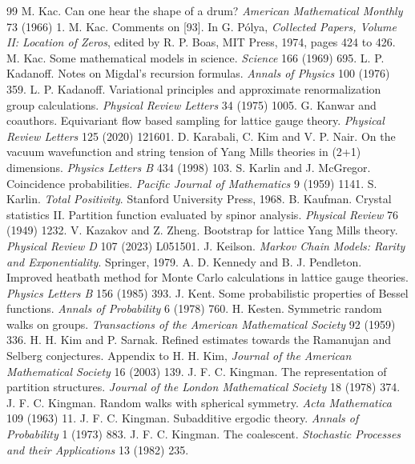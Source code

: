 \begin{thebibliography}{99}
 M. Kac. Can one hear the shape of a drum? \emph{American Mathematical Monthly} 73 (1966) 1.
 M. Kac. Comments on [93]. In G. P\'olya, \emph{Collected Papers, Volume II: Location of Zeros}, edited by R. P. Boas, MIT Press, 1974, pages 424 to 426.
 M. Kac. Some mathematical models in science. \emph{Science} 166 (1969) 695.
 L. P. Kadanoff. Notes on Migdal's recursion formulas. \emph{Annals of Physics} 100 (1976) 359.
 L. P. Kadanoff. Variational principles and approximate renormalization group calculations. \emph{Physical Review Letters} 34 (1975) 1005.
 G. Kanwar and coauthors. Equivariant flow based sampling for lattice gauge theory. \emph{Physical Review Letters} 125 (2020) 121601.
 D. Karabali, C. Kim and V. P. Nair. On the vacuum wavefunction and string tension of Yang Mills theories in (2+1) dimensions. \emph{Physics Letters B} 434 (1998) 103.
 S. Karlin and J. McGregor. Coincidence probabilities. \emph{Pacific Journal of Mathematics} 9 (1959) 1141.
 S. Karlin. \emph{Total Positivity}. Stanford University Press, 1968.
 B. Kaufman. Crystal statistics II. Partition function evaluated by spinor analysis. \emph{Physical Review} 76 (1949) 1232.
 V. Kazakov and Z. Zheng. Bootstrap for lattice Yang Mills theory. \emph{Physical Review D} 107 (2023) L051501.
 J. Keilson. \emph{Markov Chain Models: Rarity and Exponentiality}. Springer, 1979.
 A. D. Kennedy and B. J. Pendleton. Improved heatbath method for Monte Carlo calculations in lattice gauge theories. \emph{Physics Letters B} 156 (1985) 393.
 J. Kent. Some probabilistic properties of Bessel functions. \emph{Annals of Probability} 6 (1978) 760.
 H. Kesten. Symmetric random walks on groups. \emph{Transactions of the American Mathematical Society} 92 (1959) 336.
 H. H. Kim and P. Sarnak. Refined estimates towards the Ramanujan and Selberg conjectures. Appendix to H. H. Kim, \emph{Journal of the American Mathematical Society} 16 (2003) 139.
 J. F. C. Kingman. The representation of partition structures. \emph{Journal of the London Mathematical Society} 18 (1978) 374.
 J. F. C. Kingman. Random walks with spherical symmetry. \emph{Acta Mathematica} 109 (1963) 11.
 J. F. C. Kingman. Subadditive ergodic theory. \emph{Annals of Probability} 1 (1973) 883.
 J. F. C. Kingman. The coalescent. \emph{Stochastic Processes and their Applications} 13 (1982) 235.

\end{thebibliography}

